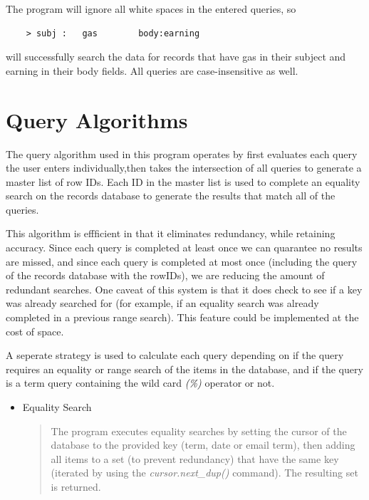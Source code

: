 \documentclass[11pt, a4paper]{article}
\begin{document}
{The program will ignore all white spaces in the entered queries, so
\begin{lstlisting}
    > subj :   gas        body:earning
\end{lstlisting}
will successfully search the data for records that have gas in their subject and earning in their body fields. All queries are case-insensitive as well.

\section{Query Algorithms}\label{SD}
The query algorithm used in this program operates by first evaluates each query the user enters individually,then takes the intersection of all queries to generate a master list of row IDs. Each ID in the master list is used to complete an equality search on the records database to generate the results that match all of the queries.\newline

\noindent This algorithm is effficient in that it eliminates redundancy, while retaining accuracy. Since each query is completed at least once we can quarantee no results are missed, and since each query is completed at most once (including the query of the records database with the rowIDs), we are reducing the amount of redundant searches. One caveat of this system is that it does check to see if a key was already searched for (for example, if an equality search was already completed in a previous range search). This feature could be implemented at the cost of space.\newline

\noindent A seperate strategy is used to calculate each query depending on if the query requires an equality or range search of the items in the database, and if the query is a term query containing the wild card \emph{(\%)} operator or not.

\begin{itemize}

\item Equality Search
	\begin{quotation}
	\noindent The program executes equality searches by setting the cursor of the database to the provided key (term, date or email term), then adding all items to a set (to prevent redundancy) that have the same key (iterated by using the \emph{cursor.next\_dup()} command). The resulting set is returned.
	\end{quotation}	


\end{itemize}}
\end{document}
